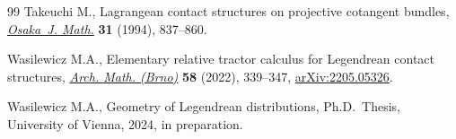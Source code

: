 \begin{thebibliography}{99}
Takeuchi M., Lagrangean contact structures on projective cotangent bundles,
 \href{https://doi.org/10.18910/9312}{\textit{Osaka~J. Math.}} \textbf{31} (1994), 837--860.

Wasilewicz M.A., Elementary relative tractor calculus for {L}egendrean contact
 structures, \href{https://doi.org/10.5817/AM2022-5-339}{\textit{Arch. Math. (Brno)}} \textbf{58} (2022), 339--347,
 \href{https://arxiv.org/abs/2205.05326}{arXiv:2205.05326}.

Wasilewicz M.A., Geometry of {L}egendrean distributions, Ph.D.~Thesis,
 {U}niversity of Vienna, 2024, in preparation.


\end{thebibliography}
